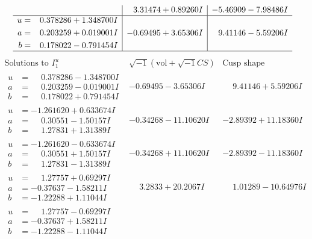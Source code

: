 \documentclass[1p]{elsarticle_modified}
\theoremstyle{definition}
\newcommand{\I}{\sqrt{-1}}
\begin{document}
$$\begin{array}{c|c|c}
 & \phantom{-}3.31474 + 0.89260 I & -5.46909 - 7.98486 I \\ \hline\begin{aligned}
u &= \phantom{-}0.378286 + 1.348700 I \\
a &= \phantom{-}0.203259 + 0.019001 I \\
b &= \phantom{-}0.178022 - 0.791454 I\end{aligned}
 & -0.69495 + 3.65306 I & \phantom{-}9.41146 - 5.59206 I\\
 \hline 
 \end{array}$$\newpage$$\begin{array}{c|c|c}  
\text{Solutions to }I^u_{1}& \I (\text{vol} + \sqrt{-1}CS) & \text{Cusp shape}\\
 \hline 
\begin{aligned}
u &= \phantom{-}0.378286 - 1.348700 I \\
a &= \phantom{-}0.203259 - 0.019001 I \\
b &= \phantom{-}0.178022 + 0.791454 I\end{aligned}
 & -0.69495 - 3.65306 I & \phantom{-}9.41146 + 5.59206 I \\ \hline\begin{aligned}
u &= -1.261620 + 0.633674 I \\
a &= \phantom{-}0.30551 - 1.50157 I \\
b &= \phantom{-}1.27831 + 1.31389 I\end{aligned}
 & -0.34268 - 11.10620 I & -2.89392 + 11.18360 I \\ \hline\begin{aligned}
u &= -1.261620 - 0.633674 I \\
a &= \phantom{-}0.30551 + 1.50157 I \\
b &= \phantom{-}1.27831 - 1.31389 I\end{aligned}
 & -0.34268 + 11.10620 I & -2.89392 - 11.18360 I \\ \hline\begin{aligned}
u &= \phantom{-}1.27757 + 0.69297 I \\
a &= -0.37637 - 1.58211 I \\
b &= -1.22288 + 1.11044 I\end{aligned}
 & \phantom{-}3.2833 + 20.2067 I & \phantom{-}1.01289 - 10.64976 I \\ \hline\begin{aligned}
u &= \phantom{-}1.27757 - 0.69297 I \\
a &= -0.37637 + 1.58211 I \\
b &= -1.22288 - 1.11044 I\end{aligned}

\end{array}$$
\end{document}
